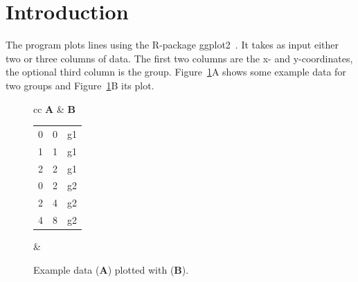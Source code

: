 \nwfilename{}\nwenddocs{}\nwdocspar%
\section*{Introduction}
The program  plots lines using the R-package
ggplot2~\cite{wic16:ggp}. It takes as input either two or three
columns of data. The first two columns are the x- and y-coordinates,
the optional third column is the group. Figure~\ref{fig:plot}A shows
some example data for two groups and Figure~\ref{fig:plot}B its plot.

\begin{figure}
  \begin{center}
    \begin{tabular}{cc}
        \textbf{A} & \textbf{B}\\
        \begin{tabular}{lll}
          0 & 0 & g1\\
          1 & 1 & g1\\
          2 & 2 & g1\\
          0 & 2 & g2\\
          2 & 4 & g2\\
          4 & 8 & g2
        \end{tabular}
        &
    \end{tabular}
  \end{center}
  \caption{Example data (\textbf{A}) plotted with 
    (\textbf{B}).}\label{fig:plot}
\end{figure}

